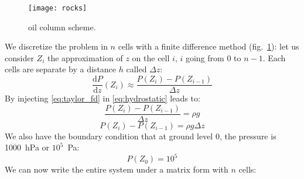 \begin{figure}[!ht]
  \centering
  \texttt{[image: rocks]}
  \caption{oil column scheme.}
  \label{fig:oil_schema}
\end{figure}
%
We discretize the problem in $n$ cells with a finite difference method (fig.~\ref{fig:oil_schema}): let us consider $Z_i$ the approximation of $z$ on the cell $i$, $i$ going from $0$ to $n-1$.
%
Each cells are separate by a distance $h$ called $\Delta{z}$:
%
\begin{equation}
\label{eq:taylor_fd}
\frac{\mathrm d P}{\mathrm d z}(Z_i) \approx \frac{P(Z_{i}) - P(Z_{i-1})}{\Delta{z}}
\end{equation}
%
By injecting \eqref{eq:taylor_fd} in \eqref{eq:hydrostatic} leads to:
%
\begin{equation}
\frac{P(Z_{i}) - P(Z_{i-1})}{\Delta{z}} = \rho{}g
\end{equation}
\begin{equation}
\label{eq:system_pressure}
P(Z_{i}) - P(Z_{i-1}) = \rho{}g\Delta{z}
\end{equation}
We also have the boundary condition that at ground level 0, the pressure is 1000~hPa or $10^5$~Pa:
%
\begin{equation}
P(Z_0) = 10^5
\end{equation}
%
We can now write the entire system under a matrix form with $n$ cells:
%
